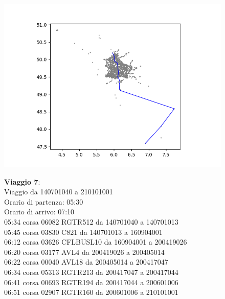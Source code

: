 \documentclass{article}
\begin{document}
\begin{figure}[H]
	\begin{minipage}{0.55\linewidth}
		\centering
		\hspace*{-6cm}\includegraphics[width=1.0\linewidth, valign=t]{figures/Figure_1}
	\end{minipage}
	\hspace*{-4cm}\begin{minipage}{0.7\linewidth}
		\textbf{Viaggio 7}:\\
		Viaggio da 140701040 a 210101001\\
		Orario di partenza: 05:30\\
		Orario di arrivo: 07:10\\
		05:34 corsa 06082 RGTR512 da 140701040 a 140701013\\
		05:45 corsa 03830 C821 da 140701013 a 160904001\\
		06:12 corsa 03626 CFLBUSL10 da 160904001 a 200419026\\
		06:20 corsa 03177 AVL4 da 200419026 a 200405014\\
		06:22 corsa 00040 AVL18 da 200405014 a 200417047\\
		06:34 corsa 05313 RGTR213 da 200417047 a 200417044\\
		06:41 corsa 00693 RGTR194 da 200417044 a 200601006\\
		06:51 corsa 02907 RGTR160 da 200601006 a 210101001
		
			\end{minipage}
\end{figure}
\end{document}
